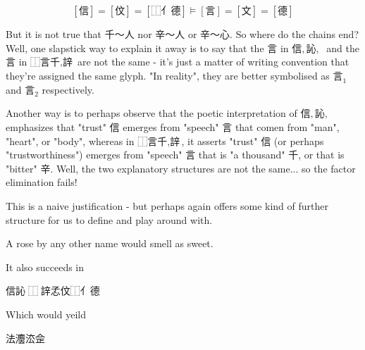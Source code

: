 $$[\text{信}]=[\text{伩}]=[\text{⿰亻德}]\models [\text{言}]=[\text{文}]=[\text{德}]$$






 But it is not true that 千～人 nor 辛～人 or 辛～心. 
 So where do the chains end?
 Well, one slapstick way to explain it away is to say that the 言 in $\text{信},\text{訫},\text{𬢭}$ and the 言 in $\text{⿰言千},\text{䛨}$ are not the same - it's just a matter of writing convention that they're assigned the same glyph. "In reality", they are better symbolised as $\text{言}_1$ and $\text{言}_2$ respectively. 

 Another way is to perhaps observe that the poetic interpretation of $\text{信},\text{訫},\text{𬢭}$ emphasizes that "trust" 信 emerges from "speech" 言 that comen from "man", "heart", or "body", whereas in $\text{⿰言千},\text{䛨}$, it asserts "trust" 信 (or perhaps "trustworthiness") emerges from "speech" 言 that is  "a thousand" 千, or that is "bitter" 辛. Well, the two explanatory structures are not the same... so the factor elimination fails! 

 This is a naive justification - but perhaps again offers some kind of further structure for us to define and play around with. 

 
 
 
 
 A rose by any other name would smell as sweet. 
 
 
 
 
 
 
 








It also succeeds in 

信訫𬢭⿰𲁢䛨孞伩⿰亻德

Which would yeild 

法灋㳒佱𫼒